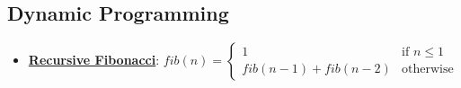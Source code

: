 \documentclass{article}%
\begin{document}
%
\subsection{Dynamic Programming}%
\label{subsec:DynamicProgramming}%
\begin{itemize}[leftmargin=*]%
\item \href{https://www.math.purdue.edu/~yipn/351/14L1-DepthFS.pdf#page=6}{\textbf{Recursive Fibonacci}}: $fib(n) = \begin{cases} 1 & \text{if } n \le 1 \\ fib(n-1) + fib(n-2) & \text{otherwise} \end{cases}$%
\end{itemize}

%
\end{document}
